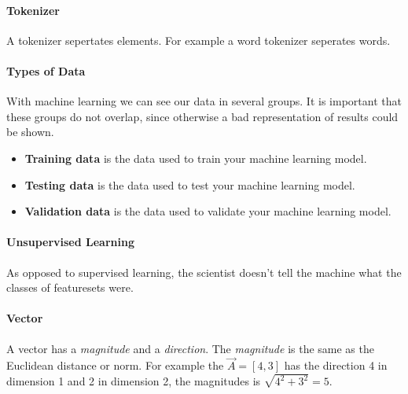\paragraph{Tokenizer}
A tokenizer sepertates elements. For example a word tokenizer seperates words.

\paragraph{Types of Data} 
With machine learning we can see our data in several groups. It is important that these groups do not overlap, since otherwise a bad representation of results could be shown.
\begin{itemize}
	\item \textbf{Training data} is the data used to train your machine learning model.
	\item \textbf{Testing data} is the data used to test your machine learning model.
	\item \textbf{Validation data} is the data used to validate your machine learning model.
\end{itemize}

\paragraph{Unsupervised Learning}
As opposed to supervised learning, the scientist doesn't tell the machine what the classes of featuresets were.

\paragraph{Vector}
A vector has a \emph{magnitude} and a \emph{direction}. The \emph{magnitude} is the same as the Euclidean distance or norm. For example the $\vec{A} = [4, 3]$ has the direction 4 in dimension 1 and 2 in dimension 2, the magnitudes is $\sqrt{4^2 + 3^2} = 5$. 


 
